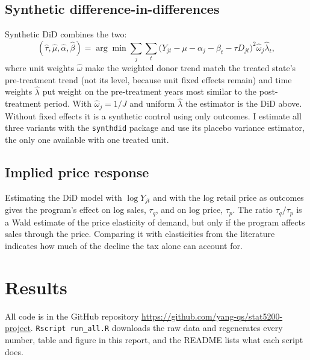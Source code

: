 \documentclass[11pt]{article}
\begin{document}
\subsection{Synthetic difference-in-differences}
Synthetic DiD \citep{arkhangelsky2021} combines the two:
\begin{equation}
  (\hat\tau, \hat\mu, \hat\alpha, \hat\beta) = \arg\min
  \sum_{j}\sum_{t} \bigl(Y_{jt} - \mu - \alpha_j - \beta_t - \tau D_{jt}\bigr)^2
  \hat\omega_j \hat\lambda_t,
\end{equation}
where unit weights $\hat\omega$ make the weighted donor trend match the treated
state's pre-treatment trend (not its level, because unit fixed effects remain)
and time weights $\hat\lambda$ put weight on the pre-treatment years most
similar to the post-treatment period. With $\hat\omega_j = 1/J$ and uniform
$\hat\lambda$ the estimator is the DiD above. Without fixed effects it is a
synthetic control using only outcomes. I estimate all three variants with the
\texttt{synthdid} package and use its placebo variance estimator, the only one
available with one treated unit.

\subsection{Implied price response}
Estimating the DiD model with $\log Y_{jt}$ and with the log retail price as
outcomes gives the program's effect on log sales, $\tau_q$, and on log price,
$\tau_p$. The ratio $\tau_q/\tau_p$ is a Wald estimate of the price elasticity
of demand, but only if the program affects sales through the price. Comparing it
with elasticities from the literature indicates how much of the decline the tax
alone can account for.

\section{Results}
All code is in the GitHub repository
\url{https://github.com/yang-qs/stat5200-project}. \texttt{Rscript run\_all.R}
downloads the raw data and regenerates every number, table and figure in this
report, and the README lists what each script does.
\end{document}
